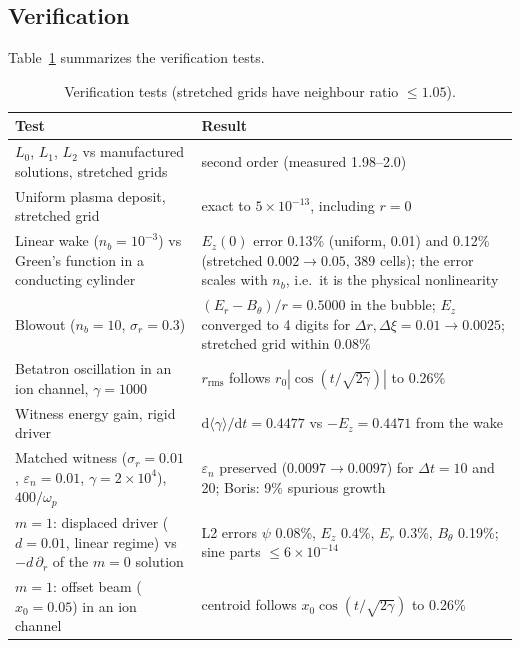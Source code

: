 \documentclass[aps,prab,reprint,floatfix,superscriptaddress,amsmath,amssymb]{revtex4-2}
\newcommand{\dd}{\mathrm{d}}
\begin{document}
\subsection{Verification}

Table~\ref{tab:verif} summarizes the verification tests.

\begin{table}[t]
\caption{Verification tests (stretched grids have neighbour ratio $\le1.05$).}
\label{tab:verif}
\begin{ruledtabular}
\begin{tabular}{p{}p{}}
Test & Result \\ \hline
$L_0$, $L_1$, $L_2$ vs manufactured solutions, stretched grids & second order (measured 1.98--2.0) \\
Uniform plasma deposit, stretched grid & exact to $5\times10^{-13}$, including $r=0$ \\
Linear wake ($n_b=10^{-3}$) vs Green's function in a conducting cylinder & $E_z(0)$ error 0.13\% (uniform, 0.01) and 0.12\% (stretched $0.002\to0.05$, 389 cells); the error scales with $n_b$, i.e.\ it is the physical nonlinearity \\
Blowout ($n_b=10$, $\sigma_r=0.3$) & $(E_r-B_\theta)/r = 0.5000$ in the bubble; $E_z$ converged to 4 digits for $\Delta r,\Delta\xi = 0.01\to0.0025$; stretched grid within 0.08\% \\
Betatron oscillation in an ion channel, $\gamma=1000$ & $r_\mathrm{rms}$ follows $r_0|\cos(t/\sqrt{2\gamma})|$ to 0.26\% \\
Witness energy gain, rigid driver & $\dd\langle\gamma\rangle/\dd t = 0.4477$ vs $-E_z = 0.4471$ from the wake \\
Matched witness ($\sigma_r=0.01$, $\varepsilon_n=0.01$, $\gamma=2\times10^4$), $400/\omega_p$ & $\varepsilon_n$ preserved ($0.0097\to0.0097$) for $\Delta t = 10$ and 20; Boris: 9\% spurious growth \\
$m=1$: displaced driver ($d=0.01$, linear regime) vs $-d\,\partial_r$ of the $m=0$ solution & L2 errors $\psi$ 0.08\%, $E_z$ 0.4\%, $E_r$ 0.3\%, $B_\theta$ 0.19\%; sine parts $\le 6\times10^{-14}$ \\
$m=1$: offset beam ($x_0=0.05$) in an ion channel & centroid follows $x_0\cos(t/\sqrt{2\gamma})$ to 0.26\% \\
\end{tabular}
\end{ruledtabular}
\end{table}
\end{document}
